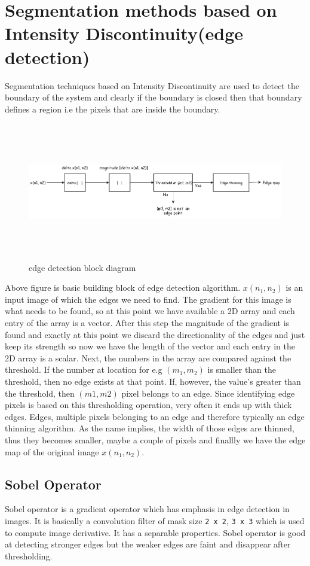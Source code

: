\chapter{Segmentation methods based on Intensity Discontinuity(edge detection)}
Segmentation techniques based on Intensity Discontinuity are used to detect the boundary of the system and clearly if the boundary is closed then that boundary defines a region i.e the pixels that are inside the boundary.

\begin{figure}[h!]
  \centering
  \includegraphics[width=15cm,height=6cm,keepaspectratio]{img/edge_detection_block.png}
  \caption{edge detection block diagram}
\end{figure}
Above figure is basic building block of edge detection algorithm. $x(n_1,n_2)$ is an input image of which the edges we need to find. The gradient for this image is what needs to be found, so at this point we have available a 2D array and
each entry of the array is a vector. After this step the magnitude of the gradient is found and exactly at this point we discard the directionality of the edges and just keep its strength so now we have the length of the vector and each entry in the 2D array is a scalar. Next, the numbers in the array are compared against the threshold. If the number at location for e.g $(m_1,m_2)$ is smaller than the threshold, then no edge exists at that point. If, however, the value's greater than the threshold, then $(m1, m2)$ pixel belongs to an edge. Since identifying edge pixels is based on this thresholding operation, very often it ends up with thick edges. Edges, multiple pixels belonging to an edge and therefore typically an edge thinning algorithm.  As the name implies, the width of those edges are thinned, thus they becomes smaller, maybe a couple of pixels and finallly we have the edge map of the original image $x(n_1, n_2)$.
\section{Sobel Operator}
Sobel operator is a gradient operator which has emphasis in edge detection in images. It is basically a convolution filter of mask
size \texttt{2 x 2}, \texttt{3 x 3} which is used to compute image derivative. It has a separable properties. Sobel operator is good at detecting stronger edges but the weaker edges are faint and disappear after thresholding.


